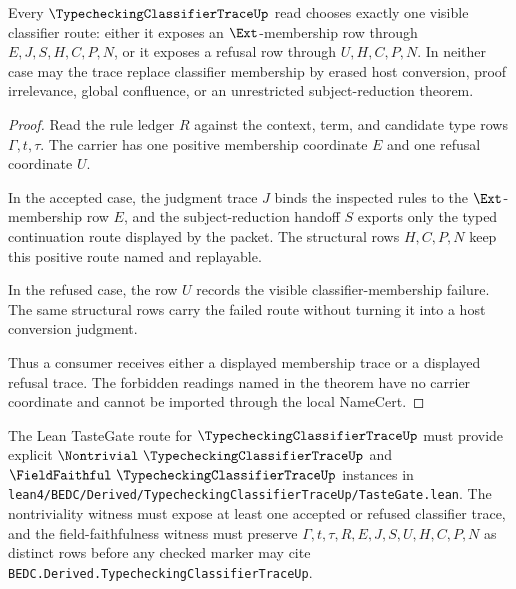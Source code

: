 \begin{theorem}
\label{thm:typechecking-classifier-trace-membership-refusal}
Every $\TypecheckingClassifierTraceUp$ read chooses exactly one visible classifier route: either it exposes an $\Ext$-membership row through $E,J,S,H,C,P,N$, or it exposes a refusal row through $U,H,C,P,N$. In neither case may the trace replace classifier membership by erased host conversion, proof irrelevance, global confluence, or an unrestricted subject-reduction theorem.
\end{theorem}
\begin{proof}
Read the rule ledger $R$ against the context, term, and candidate type rows $\Gamma,t,\tau$. The carrier has one positive membership coordinate $E$ and one refusal coordinate $U$.

In the accepted case, the judgment trace $J$ binds the inspected rules to the $\Ext$-membership row $E$, and the subject-reduction handoff $S$ exports only the typed continuation route displayed by the packet. The structural rows $H,C,P,N$ keep this positive route named and replayable.

In the refused case, the row $U$ records the visible classifier-membership failure. The same structural rows carry the failed route without turning it into a host conversion judgment.

Thus a consumer receives either a displayed membership trace or a displayed refusal trace. The forbidden readings named in the theorem have no carrier coordinate and cannot be imported through the local NameCert.
\end{proof}



The Lean TasteGate route for $\TypecheckingClassifierTraceUp$ must provide explicit $\Nontrivial\ \TypecheckingClassifierTraceUp$ and $\FieldFaithful\ \TypecheckingClassifierTraceUp$ instances in \texttt{lean4/BEDC/Derived/TypecheckingClassifierTraceUp/TasteGate.lean}. The nontriviality witness must expose at least one accepted or refused classifier trace, and the field-faithfulness witness must preserve $\Gamma,t,\tau,R,E,J,S,U,H,C,P,N$ as distinct rows before any checked marker may cite \texttt{BEDC.Derived.TypecheckingClassifierTraceUp}.

